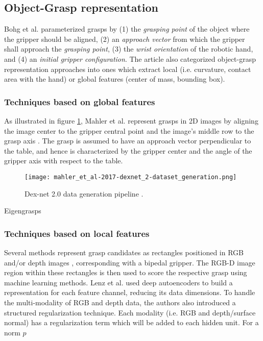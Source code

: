 \subsection{Object-Grasp representation}
Bohg et al. \cite{Bohg2014} parameterized grasps by (1) the \emph{grasping point} of the object where the gripper
should be aligned, (2) an \emph{approach vector} from which the gripper shall approach the \emph{grasping point},
(3) the \emph{wrist orientation} of the robotic hand, and (4) an \emph{initial gripper configuration}.
The article also categorized object-grasp representation approaches into ones which extract local (i.e. curvature,
contact area with the hand) or global features (center of mass, bounding box).

\subsubsection*{Techniques based on global features}
As illustrated in figure \ref{fig:dexnet-data-gen}, Mahler et al. represent grasps in 2D images by aligning the image
center to the gripper central point and the image's middle row to the grasp axis \cite{mahler2017}. The grasp is assumed
to have an approach vector perpendicular to the table, and hence is characterized by the gripper center and the angle of
the gripper axis with respect to the table.

\begin{figure}[H]
    \centering
    \texttt{[image: mahler\_et\_al-2017-dexnet\_2-dataset\_generation.png]}
    \caption{Dex-net 2.0 data generation pipeline \cite{mahler2017}.}
    \label{fig:dexnet-data-gen}
\end{figure}

Eigengrasps \cite{Goldfeder2011} 

\subsubsection*{Techniques based on local features}

Several methods represent grasp candidates as rectangles positioned in RGB and/or depth images \cite{lenz2015,jiang2011},
corresponding with a bipedal gripper. The RGB-D image region within these rectangles is then used to score the
respective grasp using machine learning methods. Lenz et al. \cite{lenz2015} used deep autoencoders to build a
representation for each feature channel, reducing its data dimensions. To handle the multi-modality of RGB and
depth data, the authors also introduced a structured regularization technique. Each modality (i.e. RGB and depth/surface
normal) has a regularization term which will be added to each hidden unit. For a norm $p$

